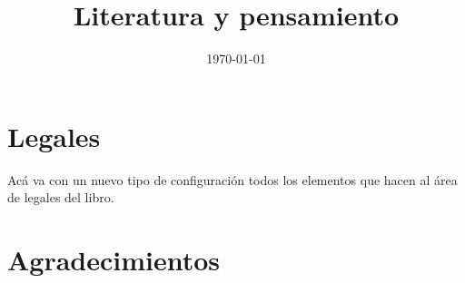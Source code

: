 \newif\ifPDF%
\newif\ifBLACKPDF%
\newif\ifHTML%
\newif\ifEPUB%
\newif\ifODT%

\HTMLtrue




\ifPDF
\usepackage[hyphenation,homeoarchy,draft,homeoarchywordcolor=yellow,homeoarchycharcolor=orange]{impnattypo}
\usepackage[allcolors=magenta,colorlinks]{hyperref}

\usepackage{hyperxmp}
	\else
	\ifBLACKPDF
	\usepackage[cam,width=18truecm,height=25.5truecm,center]{crop}
	\usepackage[draft]{hyperref}
	
	\usepackage{hyperxmp}
		\else
		\ifEPUB
		\usepackage[hyperindex=true,colorlinks]{hyperref}
		
			\else
			\ifHTML
			\usepackage{hyperref}
			
			\title{Literatura y pensamiento}
			\date{\today}
				\else
				\ifODT
				\usepackage[draft]{hyperref}
%				
				\fi
			\fi
		\fi
	\fi
\fi


\frontmatter

\ifEPUB
	\ifdefined\HCode
	\phantomsection
	\addcontentsline{toc}{section}{Portada}
	\coverimage{./media/cover.png}
	\clearpage
	\fi
\fi

\ifPDF

	\else
	\ifBLACKPDF
	
	\fi
\fi

\tableofcontents

\ifHTML
\chapter{Legales}
Acá va con un nuevo tipo de configuración todos los elementos que hacen al área de legales del libro.
\fi

\chapter{Agradecimientos}
\ifPDF
\Author{Andrés Racket}
	\else
	\ifBLACKPDF
	\Author{Andrés Racket}
	\fi
\fi

